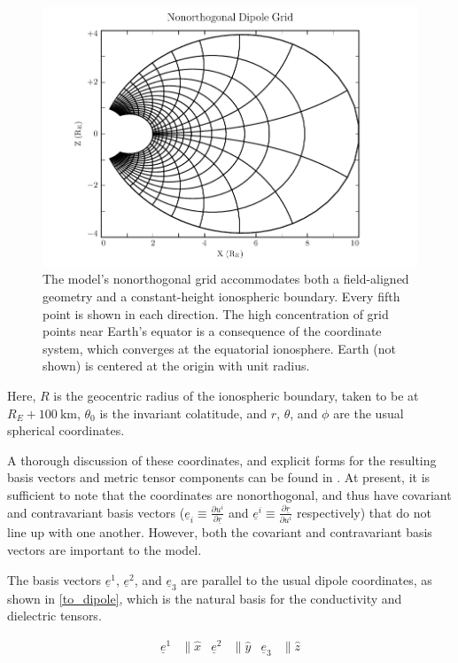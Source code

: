 \documentclass[draft,linenumbers]{agujournal}
\begin{document}
\begin{figure}
    \begin{center}
    \includegraphics[width=\textwidth]{figures/fig_grid.pdf}
    \caption{
        The model's nonorthogonal grid accommodates both a field-aligned geometry and a constant-height ionospheric boundary. Every fifth point is shown in each direction. The high concentration of grid points near Earth's equator is a consequence of the coordinate system, which converges at the equatorial ionosphere. Earth (not shown) is centered at the origin with unit radius.
    }
    \label{fig_grid}
    \end{center}
\end{figure}

Here, $R$ is the geocentric radius of the ionospheric boundary, taken to be at $R_E + \SI{100}{\km}$, $\theta_0$ is the invariant colatitude, and $r$, $\theta$, and $\phi$ are the usual spherical coordinates.

A thorough discussion of these coordinates, and explicit forms for the resulting basis vectors and metric tensor components can be found in \citet{lysak_2004}. At present, it is sufficient to note that the coordinates are nonorthogonal, and thus have covariant and contravariant basis vectors (${\underline{e}_i \equiv \frac{\partial u^i}{\partial \underline{r}}}$ and ${\underline{e}^i \equiv \frac{\partial \underline{r}}{\partial u^i}}$ respectively) that do not line up with one another. However, both the covariant and contravariant basis vectors are important to the model.

The basis vectors $\underline{e}^1$, $\underline{e}^2$, and $\underline{e}_3$ are parallel to the usual dipole coordinates, as shown in \cref{to_dipole}, which is the natural basis for the conductivity and dielectric tensors.
\begin{linenomath*}
\begin{align}
    \label{to_dipole}
    \underline{e}^1 &\parallel \hat{x} &
    \underline{e}^2 &\parallel \hat{y} &
    \underline{e}_3 &\parallel \hat{z}
\end{align}
\end{linenomath*}
\end{document}
